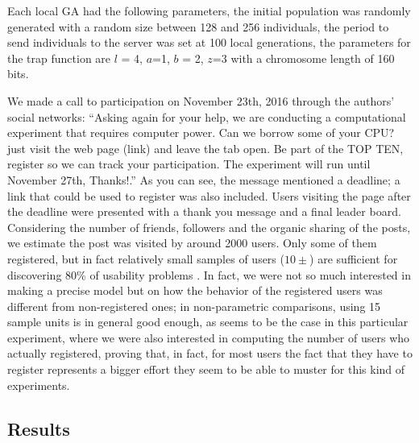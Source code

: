 \documentclass{llncs}
\begin{document}
Each local GA had the following parameters, the initial population was randomly generated
with a random size between 128 and 256 individuals, the period to send individuals to the server
was set at 100 local generations, the parameters for the trap function are $l$ = 4,
$a$=1, $b$ = 2, $z$=3 with a chromosome length of 160 bits.


We made a call to participation on November 23th,
2016 through the authors' social networks: ``Asking again for your help, we are conducting a computational experiment
that requires computer power. Can we borrow some of your CPU? just visit the web page (link)
and leave the tab open. Be part of the TOP TEN, register so we can track your participation.
The experiment will run until November 27th, Thanks!.'' As you can
see, the message mentioned a deadline; a link that could be used to
register was also included. Users visiting the page after the deadline
were presented with a thank you message and a final leader
board. Considering the number of friends, followers and the organic
sharing of the posts, we estimate the post was visited by around 2000
users. Only some of them registered, but in fact relatively small samples of users ($10\pm$) are sufficient for
discovering 80\% of usability problems \cite{Schmettow2012}. In fact,
we were not so much interested in making a precise model but on how
the behavior of the registered users was different from non-registered
ones; in non-parametric comparisons, using 15 sample units is in general
good enough, as seems to be the case in this particular
experiment, where we were also interested in computing the number of
users who actually registered, proving that, in fact, for most users
the fact that they have to register represents a bigger effort they
seem to be able to muster for this kind of experiments. 


\subsection{Results}
\label{sec:results}
\end{document}
